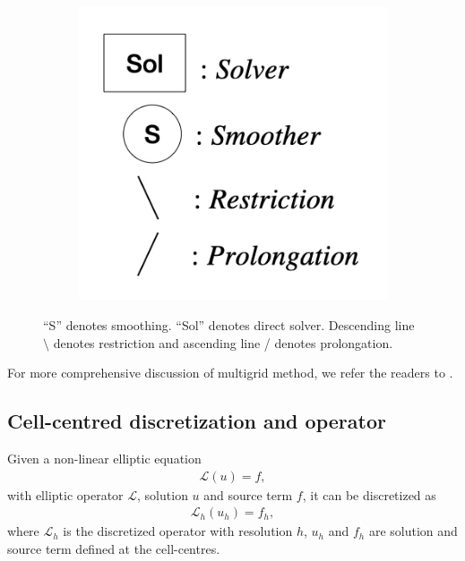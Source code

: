 \begin{figure}[h!]
	\begin{subfigure}{0.2\columnwidth}
		\centering
        \includegraphics[width=\columnwidth]{MG_note.jpeg}
	\end{subfigure}

	\caption[Four different types of four-level cycles in multigrid methods.]{
		``S'' denotes smoothing. ``Sol'' denotes direct solver.
		Descending line $\setminus$ denotes restriction and ascending line / denotes prolongation.
	}
	\label{fig:MG_cycles}
\end{figure}

For more comprehensive discussion of multigrid method,
we refer the readers to \cite{briggs2000multigrid,trottenberg2000multigrid,young2014iterative,brandt2011multigrid}.

\subsection{Cell-centred discretization and operator} %
\label{section3.1.2}
Given a non-linear elliptic equation 
\begin{align}
    \mathcal{L}\left(u\right) = f,
\end{align}
with elliptic operator $\mathcal{L}$, solution $u$ and source term $f$,
it can be discretized as
\begin{align}
    \mathcal{L}_h \left(u_h \right) = f_h,
\end{align}
where $\mathcal{L}_h$ is the discretized operator with resolution $h$,
$u_h$ and $f_h$ are solution and source term defined at the cell-centres.

